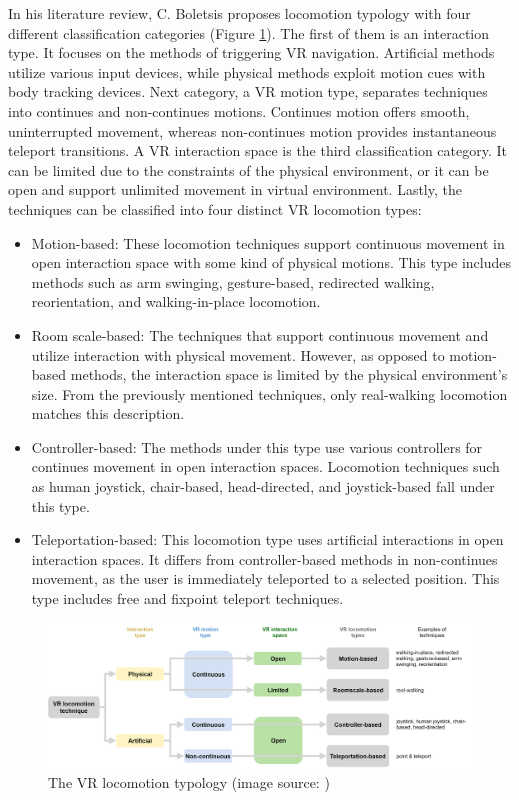 In his literature review, C. Boletsis proposes locomotion typology with four different classification categories (Figure \ref{fig:TYPOLOGY}). The first of them is an interaction type. It focuses on the methods of triggering VR navigation. Artificial methods utilize various input devices, while physical methods exploit motion cues with body tracking devices. Next category, a VR motion type, separates techniques into continues and non-continues motions. Continues motion offers smooth, uninterrupted movement, whereas non-continues motion provides instantaneous teleport transitions. A VR interaction space is the third classification category. It can be limited due to the constraints of the physical environment, or it can be open and support unlimited movement in virtual environment. Lastly, the techniques can be classified into four distinct VR locomotion types:

\begin{itemize}
\item Motion-based: These locomotion techniques support continuous movement in open interaction space with some kind of physical motions. This type includes methods such as arm swinging, gesture-based, redirected walking, reorientation, and walking-in-place locomotion.
\item Room scale-based: The techniques that support continuous movement and utilize interaction with physical movement. However, as opposed to motion-based methods, the interaction space is limited by the physical environment's size. From the previously mentioned techniques, only real-walking locomotion matches this description.
\item Controller-based: The methods under this type use various controllers for continues movement in open interaction spaces. Locomotion techniques such as human joystick, chair-based, head-directed, and joystick-based fall under this type.
\item Teleportation-based: This locomotion type uses artificial interactions in open interaction spaces. It differs from controller-based methods in non-continues movement, as the user is immediately teleported to a selected position. This type includes free and fixpoint teleport techniques.
\end{itemize}

\begin{figure}[th]
\centering
\includegraphics[width=1\textwidth]{img/locomotion_typology.png}
\caption{The VR locomotion typology (image source: \cite{LOCOMOTIONREVIEW})}
\label{fig:TYPOLOGY}
\end{figure}

